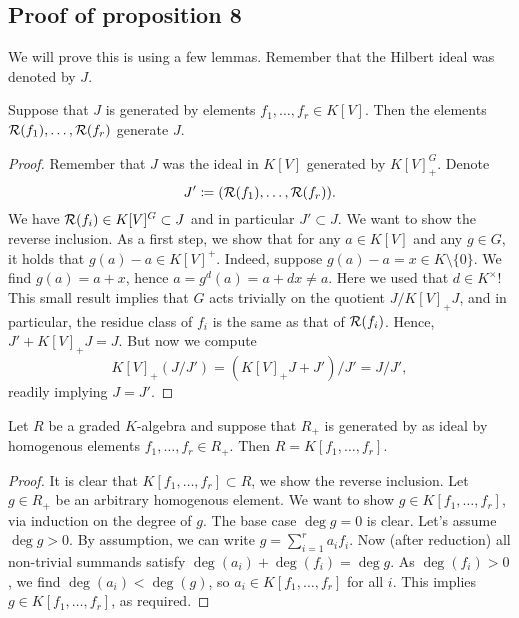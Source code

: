 \documentclass[../main.tex]{subfiles}
\begin{document}
\subsection{Proof of proposition 8} %
\label{sub:Proofs of proposition 8}
We will prove this is using a few lemmas.
Remember that the Hilbert ideal was denoted by $J$.
\begin{lem}\label{lem:8.1}
    Suppose that $J$ is generated by elements $f_1, \dots, f_r \in K[V]$. Then
    the elements
    $\mathcal{R}(f_1), \dots, \mathcal{R}(f_r)$ generate $J$.
\begin{proof}
    Remember that $J$ was the ideal in $K[V]$ generated by $K[V]^G_+$. 
    Denote $$J' \coloneqq (\mathcal{R}(f_1), \dots, \mathcal{R}(f_r)).$$ We have $\mathcal{R}(f_i) \in
    K[V]^G\subset J$ and in particular $J' \subset J$. We want to show the
    reverse inclusion. As a first step, we show that for any 
    $a \in K[V]$ and any $g \in G$, it holds that $g(a) - a \in K[V]^+$. 
    Indeed, suppose $g(a) - a = x \in K\setminus\{0\}$. We find $g(a) = a + x$, hence
    $a = g^d(a) = a + dx \neq a$. Here we used that $d \in K^\times$! This small
    result implies that $G$ acts trivially on the quotient $J/K[V]_+ J$, and in particular,
    the residue class of $f_i$ is the same as that of $\mathcal{R}(f_i)$. Hence, 
    $J' + K[V]_+ J = J$. But now we compute
    \begin{equation*}
        K[V]_+(J/J') = (K[V]_+ J + J')/J' = J/J',
    \end{equation*}
    readily implying $J = J'$.
\end{proof}

\begin{lem}
    Let $R$ be a graded $K$-algebra and suppose that $R_{+}$ is generated by
    as ideal by homogenous elements $f_1, \dots, f_r \in R_+$. Then $R = K[f_1,
    \dots, f_r]$.
\begin{proof}
    It is clear that $K[f_1, \dots, f_r] \subset R$, we show the reverse inclusion.
    Let $g \in R_+$ be an arbitrary homogenous element. 
    We want to show $g \in K[f_1, \dots, f_r]$, via induction on the degree of $g$.
    The base case $\deg g = 0$ is clear. Let's assume $\deg g > 0$. By assumption,
    we can write $g = \sum_{i=1}^r a_i f_i$. Now (after reduction) all
    non-trivial summands satisfy $\deg(a_i) + \deg(f_i) = \deg g$. As
    $\deg(f_i) > 0$, we find $\deg(a_i) < \deg (g)$, so $a_i \in K[f_1, \dots, f_r]$ 
    for all $i$. This implies $g \in K[f_1, \dots, f_r]$, as required.
\end{proof}
\end{lem}

\end{lem}
\end{document}
